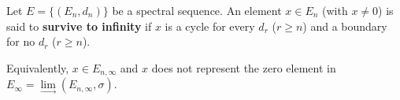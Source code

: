 Let $E = \{(E_n, d_n)\}$ be a spectral sequence. An element $x \in E_n$ (with $x \neq 0$) is said to \textbf{survive to infinity} if $x$ is a cycle for every $d_r$ ($r \geq n$) and a boundary for no $d_r$ ($r \geq n$).

Equivalently, $x \in E_{n,\infty}$ and $x$ does not represent the zero element in $E_\infty = \lim\limits_{\longrightarrow} (E_{n,\infty}, \sigma)$.
